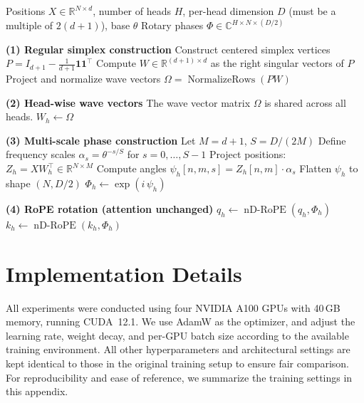 \documentclass{article}
\theoremstyle{plain}
\theoremstyle{definition}
\theoremstyle{remark}
\begin{document}
\begin{algorithm}[t]
\caption{nD-RoPE with Regular Simplex Wave Vectors}
\label{alg:ndrope}
\begin{algorithmic}[1]
\REQUIRE Positions $X \in \mathbb{R}^{N \times d}$, number of heads $H$, per-head dimension $D$ (must be a multiple of $2(d+1)$), base $\theta$
\ENSURE Rotary phases $\Phi \in \mathbb{C}^{H \times N \times (D/2)}$

\STATE \textbf{(1) Regular simplex construction}
\STATE Construct centered simplex vertices $P = I_{d+1} - \frac{1}{d+1}\mathbf{1}\mathbf{1}^\top$
\STATE Compute $W \in \mathbb{R}^{(d+1)\times d}$ as the right singular vectors of $P$
\STATE Project and normalize wave vectors $\Omega = \operatorname{NormalizeRows}(P W)$

\STATE \textbf{(2) Head-wise wave vectors}
\STATE The wave vector matrix $\Omega$ is shared across all heads.
    \STATE $W_h \leftarrow \Omega$
\ENDFOR

\STATE \textbf{(3) Multi-scale phase construction}
\STATE Let $M = d+1$, $S = D / (2M)$
\STATE Define frequency scales $\alpha_s = \theta^{-s/S}$ for $s=0,\dots,S-1$
    \STATE Project positions: $Z_h = X W_h^\top \in \mathbb{R}^{N \times M}$
    \STATE Compute angles $\psi_h[n,m,s] = Z_h[n,m] \cdot \alpha_s$
    \STATE Flatten $\psi_h$ to shape $(N, D/2)$
    \STATE $\Phi_h \leftarrow \exp(i\,\psi_h)$
\ENDFOR

\STATE \textbf{(4) RoPE rotation (attention unchanged)}
    \STATE $q_h \leftarrow \operatorname{nD-RoPE}(q_h, \Phi_h)$
    \STATE $k_h \leftarrow \operatorname{nD-RoPE}(k_h, \Phi_h)$
\ENDFOR
\end{algorithmic}
\end{algorithm}


\section{Implementation Details}
\label{ap:detail}
All experiments were conducted using four NVIDIA A100 GPUs with 40\,GB memory, 
running CUDA~12.1.  We use AdamW as the optimizer, and adjust the learning rate, weight decay, and per-GPU batch size according to the available training environment. All other hyperparameters and architectural settings are kept identical to those in the original training setup to ensure fair comparison. For reproducibility and ease of reference, we summarize the training settings in this appendix. 
\end{document}

